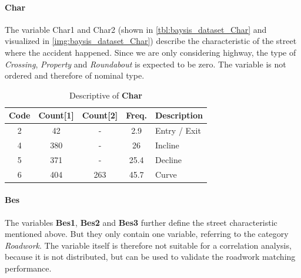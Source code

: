 \paragraph{Char}
\label{baysis_dataset_Char}
The variable Char1 and Char2 (shown in \autoref{tbl:baysis_dataset_Char} and visualized in \ref{img:baysis_dataset_Char}) describe the characteristic of the street where the accident happened. Since we are only considering highway, the type of \textit{Crossing}, \textit{Property} and \textit{Roundabout} is expected to be zero. The variable is not ordered and therefore of nominal type.  
\begin{table}[ht]
	\centering
	\small
	\begin{tabular}{c|c|c|c|l}
		\toprule
		Code & Count[1] & Count[2] & Freq. & Description \\ 
		\midrule
	    2 & 42	& -		& 2.9	& Entry / Exit \\
	    4 & 380	& -		& 26	& Incline \\
	    5 & 371	& -		& 25.4	& Decline \\
	    6 & 404	& 263	& 45.7	& Curve \\
		\bottomrule
	\end{tabular}
	\caption{Descriptive of \textbf{Char}}
	\label{tbl:baysis_dataset_Char}
	\vspace{-8mm}
\end{table}
\paragraph{Bes}
\label{baysis_dataset_Bes}
The variables \textbf{Bes1}, \textbf{Bes2} and \textbf{Bes3} further define the street characteristic mentioned above. But they only contain one variable, referring to the category \textit{Roadwork}. The variable itself is therefore not suitable for a correlation analysis, because it is not distributed, but can be used to validate the roadwork matching performance.
